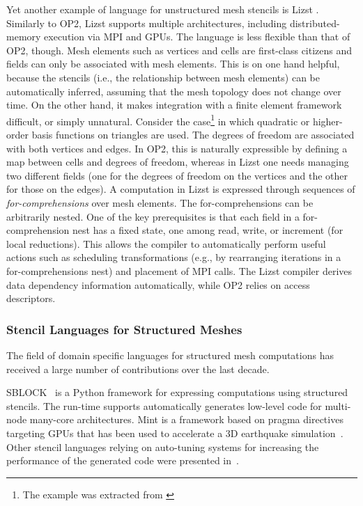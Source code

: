 Yet another example of language for unstructured mesh stencils is Lizst \citep{lizst}. Similarly to OP2, Lizst supports multiple architectures, including distributed-memory execution via MPI and GPUs. The language is less flexible than that of OP2, though. Mesh elements such as vertices and cells are first-class citizens and fields can only be associated with mesh elements. This is on one hand helpful, because the stencils (i.e., the relationship between mesh elements) can be automatically inferred, assuming that the mesh topology does not change over time. On the other hand, it makes integration with a finite element framework difficult, or simply unnatural. Consider the case\footnote{The example was extracted from \cite{florian-thesis}} in which quadratic or higher-order basis functions on triangles are used. The degrees of freedom are associated with both vertices and edges. In OP2, this is naturally expressible by defining a map between cells and degrees of freedom, whereas in Lizst one needs managing two different fields (one for the degrees of freedom on the vertices and the other for those on the edges). A computation in Lizst is expressed through sequences of {\em for-comprehensions} over mesh elements. The for-comprehensions can be arbitrarily nested. One of the key prerequisites is that each field in a for-comprehension nest has a fixed state, one among read, write, or increment (for local reductions). This allows the compiler to automatically perform useful actions such as scheduling transformations (e.g., by rearranging iterations in a for-comprehensions nest) and placement of MPI calls. The Lizst compiler derives data dependency information automatically, while OP2 relies on access descriptors. 

\subsubsection{Stencil Languages for Structured Meshes}
The field of domain specific languages for structured mesh computations has received a large number of contributions over the last decade. 

SBLOCK~\citep{sblock-cite} is a Python framework for expressing computations using structured stencils. The run-time supports automatically generates low-level code for multi-node many-core architectures. Mint is a framework based on pragma directives targeting GPUs that has been used to accelerate a 3D earthquake simulation~\citep{mint-simulation-cite}. Other stencil languages relying on auto-tuning systems for increasing the performance of the generated code were presented in~\cite{zhang-mueller-cite,datta-cite,patus}. 

